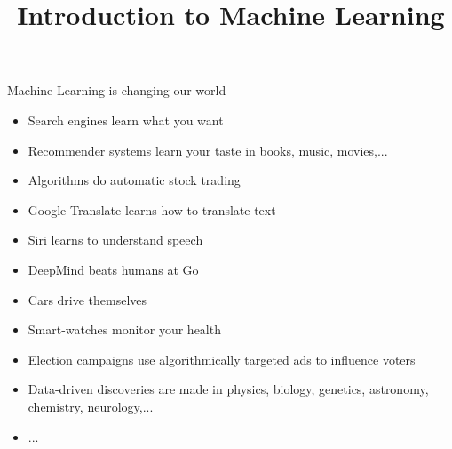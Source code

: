 \documentclass[11pt,compress,t,notes=noshow, xcolor=table]{beamer}
\title{Introduction to Machine Learning}
\institute{\href{https://compstat-lmu.github.io/lecture_i2ml/}{compstat-lmu.github.io/lecture\_i2ml}}
\date{}
\begin{document}






\sloppy


\begin{frame}{Machine Learning is changing our world}

\begin{itemize}

  \item Search engines learn what you want
  
  \item Recommender systems learn your taste in books, music, movies,...
  
  \item Algorithms do automatic stock trading
  
  \item Google Translate learns how to translate text
  
  \item Siri learns to understand speech
  
  \item DeepMind beats humans at Go
  
  \item Cars drive themselves
  
  
  \item Smart-watches monitor your health
  
  \item Election campaigns use algorithmically targeted ads to influence voters
  
  \item Data-driven discoveries are made in physics, biology, genetics, 
  astronomy, chemistry, neurology,...
  
  \item ...
  
\end{itemize}

\end{frame}
\end{document}
